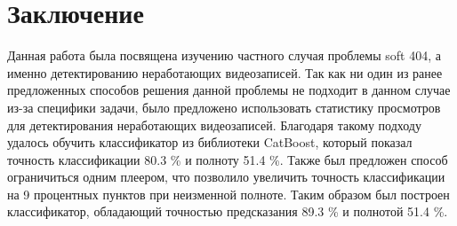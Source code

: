 
\chapter{Заключение}

Данная работа была посвящена изучению частного случая проблемы soft 404, а именно детектированию неработающих видеозаписей. Так как ни один из ранее предложенных способов решения данной проблемы не подходит в данном случае из-за специфики задачи, было предложено использовать статистику просмотров для детектирования неработающих видеозаписей. Благодаря такому подходу удалось обучить классификатор из библиотеки CatBoost, который показал точность классификации 80.3 \% и полноту 51.4 \%. Также был предложен способ ограничиться одним плеером, что позволило увеличить точность классификации на 9 процентных пунктов при неизменной полноте. Таким образом был построен классификатор, обладающий точностью предсказания 89.3 \% и полнотой 51.4 \%.